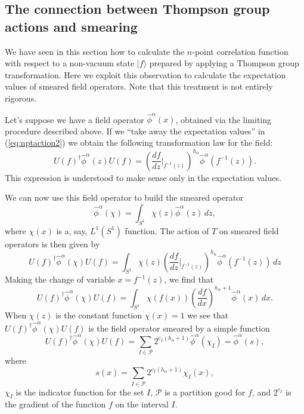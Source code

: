 \documentclass[11pt,oneside]{amsart}
\theoremstyle{plain}%
\theoremstyle{definition}
\theoremstyle{remark}
\begin{document}
\subsection{The connection between Thompson group actions and smearing}
We have seen in this section how to calculate the $n$-point correlation function with respect to a non-vacuum state $|f\rangle$ prepared by applying a Thompson group transformation. Here we exploit this observation to calculate the expectation values of smeared field operators. Note that this treatment is not entirely rigorous.

Let's suppose we have a field operator $\hat{\phi}^\alpha(x)$, obtained via the limiting procedure described above. If we ``take away the expectation values'' in (\ref{eq:nptaction2}) we obtain the following transformation law for the field:
\begin{equation}
      U(f)^\dag \hat{\phi}^\alpha(z) U(f) = \left(\frac{df}{dz}\bigg|_{f^{-1}(z)}\right)^{h_{\alpha}} \hat{\phi}^\alpha(f^{-1}(z)).
\end{equation}
This expression is understood to make sense only in the expectation values.


We can now use this field operator to build the smeared operator
\begin{equation}
      \hat{\phi}^\alpha(\chi) = \int_{S^1} \chi(z) \hat{\phi}^\alpha(z)\, dz,
\end{equation}
where $\chi(x)$ is a, say, $L^1(S^1)$ function. The action of $T$ on smeared field operators is then given by
\begin{equation}
      U(f)^\dag \hat{\phi}^\alpha(\chi) U(f) = \int_{S^1} \chi(z) \left(\frac{df}{dz}\bigg|_{f^{-1}(z)}\right)^{h_{\alpha}} \hat{\phi}^\alpha(f^{-1}(z))\, dz
\end{equation}
Making the change of variable $x= f^{-1}(z)$, we find that
\begin{equation}
      U(f)^\dag \hat{\phi}^\alpha(\chi) U(f) = \int_{S^1} \chi(f(x)) \left(\frac{df}{dx}\right)^{h_{\alpha}+1} \hat{\phi}^\alpha(x)\, dx.
\end{equation}
When $\chi(z)$ is the constant function $\chi(x)=1$ we see that $U(f)^\dag \hat{\phi}^\alpha(\chi) U(f)$ is the field operator smeared by a simple function
\begin{equation}
      U(f)^\dag \hat{\phi}^\alpha(\chi) U(f) = \sum_{I\in \mathcal{P}} 2^{c_I(h_\alpha+1)}\hat{\phi}^\alpha(\chi_I) = \hat{\phi}^\alpha(s),
\end{equation}
where
\begin{equation}
      s(x) = \sum_{I\in \mathcal{P}}2^{c_I(h_\alpha+1)}\chi_I(x),
\end{equation}
$\chi_I$ is the indicator function for the set $I$, $\mathcal{P}$ is a partition good for $f$, and $2^{c_I}$ is the gradient of the function $f$ on the interval $I$.
\end{document}
